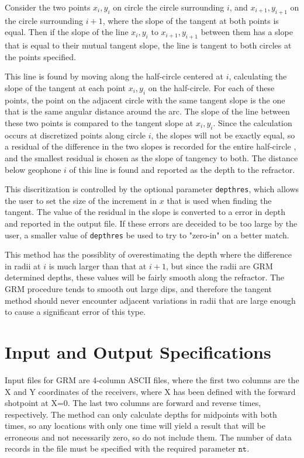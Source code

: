 {Consider the two points $x_{i},y_{i}$ on circle the circle surrounding $i$, 
and $x_{i+1},y_{i+1}$
on the circle surrounding $i+1$, where the slope of the tangent at both points is equal.
Then if the slope of 
the line $x_{i},y_{i}$ to $x_{i+1},y_{i+1}$ between them has a slope that
is equal
to their mutual tangent slope, the line is tangent to both circles at the 
points specified.  

This line is found by moving along the half-circle centered at $i$, calculating the slope
of the tangent at each point $x_{i},y_{i}$ on the half-circle.  For each of these
points, the point on the adjacent circle with the same tangent slope is the
one that is the same angular distance around the arc.  The slope of the line
between these two points is compared to the tangent slope at $x_{i},y_{i}$.
 Since
the calculation occurs at discretized points along circle $i$, the slopes
will not be exactly equal, so a residual of the difference in the two slopes
is recorded for the entire half-circle , and the smallest residual is chosen
as the slope of tangency to both.  The distance below geophone $i$ of this 
line is found and reported as the depth to the refractor.

This discritization is controlled by the optional parameter \texttt{depthres},
which
allows the user to set the size of the increment in $x$ that is used when finding
the tangent.  The value of the residual in the slope is converted to a 
error in depth and reported in the output file.  If these errors
are deceided to be too large by the user, a smaller value of \texttt{depthres}
be used to try to "zero-in" on a better match.

This method has the possiblity of overestimating the depth where the difference
in radii at $i$ is much larger than that at $i+1$, but since the radii are
GRM determined depths, these
values will be fairly smooth along the refractor.  The GRM procedure tends 
to smooth out large dips, and therefore the tangent method should never 
encounter adjacent variations in radii that are large enough to cause a 
significant error of this type. 

\section*{Input and Output Specifications}

Input files for GRM are 4-column ASCII files, where the first two columns
are the X and Y coordinates of the receivers, where X has been defined 
with the forward shotpoint at X=0.  The last two columns are forward
and reverse times, respectively.  The method can only calculate depths
for midpoints with both times, so any locations with only one time will
yield a result that will be erroneous and not necessarily zero, so do
not include them.  The number of data records in the file must be 
specified with the required parameter $\texttt{nt}$.

}
